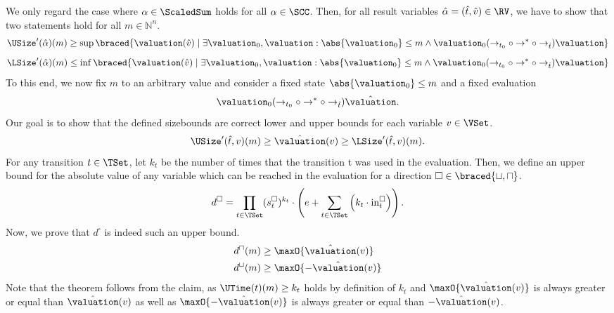 We only regard the case where $\alpha \in \ScaledSum$ holds for all $\alpha \in \SCC$.
Then, for all result variables $\hat{\alpha} = (\hat{t}, \hat{v}) \in \RV$, we have to show that two statements hold for all $m \in \mathbb{N}^n$.
\[ \USize'(\hat{\alpha})(m) \geq \sup \braced{ \valuation(\hat{v}) \mid \exists \valuation_0, \valuation: \abs{\valuation_0} \leq m \wedge \valuation_0 (\rightarrow_{t_0} \circ \rightarrow^* \circ \rightarrow_{\hat{t}}) \valuation} \]
\[ \LSize'(\hat{\alpha})(m) \leq \inf \braced{ \valuation(\hat{v}) \mid \exists \valuation_0, \valuation: \abs{\valuation_0} \leq m \wedge \valuation_0 (\rightarrow_{t_0} \circ \rightarrow^* \circ \rightarrow_{\hat{t}}) \valuation} \]
To this end, we now fix $m$ to an arbitrary value and consider a fixed state $\abs{\valuation_0} \leq m$ and a fixed evaluation
\[ \valuation_0 (\rightarrow_{t_0} \circ \rightarrow^* \circ \rightarrow_{\hat{t}}) \hat{\valuation}. \]
Our goal is to show that the defined sizebounds are correct lower and upper bounds for each variable $v \in \VSet$.
\begin{equation} \label{eq:sizebound_target}
  \USize'(\hat{t}, v)(m) \geq \hat{\valuation}(v) \geq \LSize'(\hat{t}, v)(m).
\end{equation}
For any transition $t \in \TSet$, let $k_t$ be the number of times that the transition t was used in the evaluation.
Then, we define an upper bound for the absolute value of any variable which can be reached in the evaluation for a direction $\square \in \braced{\sqcup, \sqcap}$.
\[ d^\square = \prod_{t \in \TSet} (s^\square_t)^{k_t} \cdot \left( e + \sum_{t \in \TSet} \left( k_t \cdot \text{in}^\square_t \right) \right). \]
Now, we prove that $d^\square$ is indeed such an upper bound.
\begin{equation} \label{eq:sizebound_hypothesis}
  \begin{split}
    d^\sqcap(m) & \geq \maxO{\hat{\valuation}(v)} \\
    d^\sqcup(m) & \geq \maxO{-\hat{\valuation}(v)}
  \end{split}
\end{equation}
Note that the theorem follows from the claim, as $\UTime(t)(m) \geq k_t$ holds by definition of $k_t$ and $\maxO{\hat{\valuation}(v)}$ is always greater or equal than $\hat{\valuation}(v)$ as well as $\maxO{-\hat{\valuation}(v)}$ is always greater or equal than $-\hat{\valuation}(v)$.

